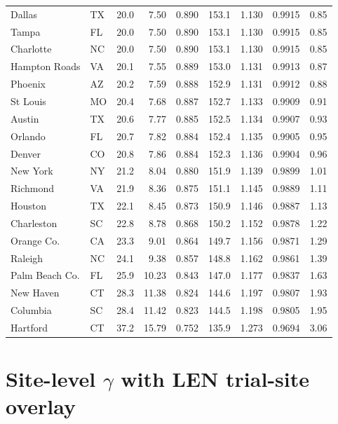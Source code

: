 \documentclass[11pt]{article}
\begin{document}
\begin{longtable}{llcrrrrrr}
Dallas & TX & 20.0 & 7.50 & 0.890 & 153.1 & 1.130 & 0.9915 & 0.85 \\
Tampa & FL & 20.0 & 7.50 & 0.890 & 153.1 & 1.130 & 0.9915 & 0.85 \\
Charlotte & NC & 20.0 & 7.50 & 0.890 & 153.1 & 1.130 & 0.9915 & 0.85 \\
Hampton Roads & VA & 20.1 & 7.55 & 0.889 & 153.0 & 1.131 & 0.9913 & 0.87 \\
Phoenix & AZ & 20.2 & 7.59 & 0.888 & 152.9 & 1.131 & 0.9912 & 0.88 \\
St Louis & MO & 20.4 & 7.68 & 0.887 & 152.7 & 1.133 & 0.9909 & 0.91 \\
Austin & TX & 20.6 & 7.77 & 0.885 & 152.5 & 1.134 & 0.9907 & 0.93 \\
Orlando & FL & 20.7 & 7.82 & 0.884 & 152.4 & 1.135 & 0.9905 & 0.95 \\
Denver & CO & 20.8 & 7.86 & 0.884 & 152.3 & 1.136 & 0.9904 & 0.96 \\
New York & NY & 21.2 & 8.04 & 0.880 & 151.9 & 1.139 & 0.9899 & 1.01 \\
Richmond & VA & 21.9 & 8.36 & 0.875 & 151.1 & 1.145 & 0.9889 & 1.11 \\
Houston & TX & 22.1 & 8.45 & 0.873 & 150.9 & 1.146 & 0.9887 & 1.13 \\
Charleston & SC & 22.8 & 8.78 & 0.868 & 150.2 & 1.152 & 0.9878 & 1.22 \\
Orange Co. & CA & 23.3 & 9.01 & 0.864 & 149.7 & 1.156 & 0.9871 & 1.29 \\
Raleigh & NC & 24.1 & 9.38 & 0.857 & 148.8 & 1.162 & 0.9861 & 1.39 \\
Palm Beach Co. & FL & 25.9 & 10.23 & 0.843 & 147.0 & 1.177 & 0.9837 & 1.63 \\
New Haven & CT & 28.3 & 11.38 & 0.824 & 144.6 & 1.197 & 0.9807 & 1.93 \\
Columbia & SC & 28.4 & 11.42 & 0.823 & 144.5 & 1.198 & 0.9805 & 1.95 \\
Hartford & CT & 37.2 & 15.79 & 0.752 & 135.9 & 1.273 & 0.9694 & 3.06 \\
\end{longtable}

\section{Site-level $\gamma$ with LEN trial-site overlay}

\label{sec:sitelevel}
\end{document}
